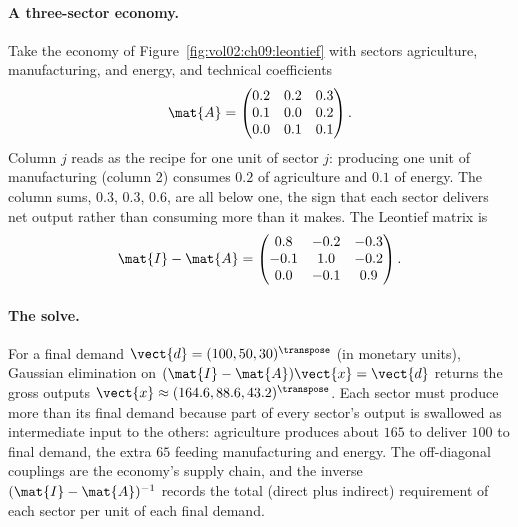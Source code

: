 \paragraph{A three-sector economy.}
Take the economy of Figure~\ref{fig:vol02:ch09:leontief} with sectors
agriculture, manufacturing, and energy, and technical coefficients
\[
\mat{A} = \begin{pmatrix}
0.2 & 0.2 & 0.3 \\
0.1 & 0.0 & 0.2 \\
0.0 & 0.1 & 0.1
\end{pmatrix}.
\]
Column $j$ reads as the recipe for one unit of sector $j$: producing
one unit of manufacturing (column 2) consumes $0.2$ of agriculture and
$0.1$ of energy. The column sums, $0.3$, $0.3$, $0.6$, are all below
one, the sign that each sector delivers net output rather than
consuming more than it makes. The Leontief matrix is
\[
\mat{I} - \mat{A} = \begin{pmatrix}
0.8 & -0.2 & -0.3 \\
-0.1 & 1.0 & -0.2 \\
0.0 & -0.1 & 0.9
\end{pmatrix}.
\]

\paragraph{The solve.}
For a final demand $\vect{d} = (100, 50, 30)^{\transpose}$ (in
monetary units), Gaussian elimination on $(\mat{I} - \mat{A})\vect{x}
= \vect{d}$ returns the gross outputs $\vect{x} \approx (164.6, 88.6,
43.2)^{\transpose}$. Each sector must produce more than its final
demand because part of every sector's output is swallowed as
intermediate input to the others: agriculture produces about $165$ to
deliver $100$ to final demand, the extra $65$ feeding manufacturing
and energy. The off-diagonal couplings are the economy's supply chain,
and the inverse $(\mat{I} - \mat{A})^{-1}$ records the total (direct
plus indirect) requirement of each sector per unit of each final
demand.


